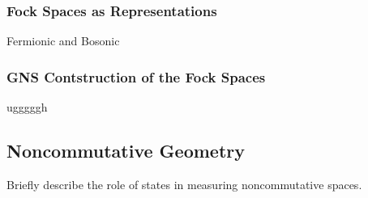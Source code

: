 \subsubsection{Fock Spaces as Representations}
Fermionic and Bosonic
\subsubsection{GNS Contstruction of the Fock Spaces}
ugggggh
\subsection{Noncommutative Geometry}
Briefly describe the role of states in measuring noncommutative spaces.